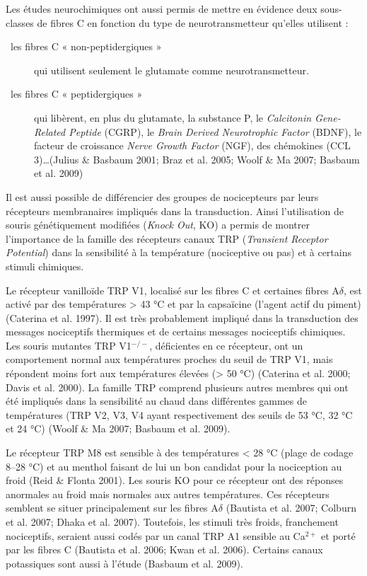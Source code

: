 \documentclass[a4paper,12pt,twoside]{report}
\begin{document}
Les études neurochimiques ont aussi permis de mettre en évidence deux sous-classes de fibres C en fonction du type de neurotransmetteur qu’elles utilisent :

\begin{description}
\item [\textbullet~les fibres C « non-peptidergiques »] qui utilisent seulement le glutamate comme neurotransmetteur. 
\item [\textbullet~les fibres C « peptidergiques »] qui libèrent, en plus du glutamate, la substance P, le \textit{Calcitonin Gene-Related Peptide} (CGRP), le \textit{Brain Derived Neurotrophic Factor} (BDNF), le facteur de croissance \textit{Nerve Growth Factor} (NGF), des chémokines (CCL 3)\ldots (Julius \& Basbaum 2001; Braz et al. 2005; Woolf \& Ma 2007; Basbaum et al. 2009)
\end{description}

Il est aussi possible de différencier des groupes de nocicepteurs par leurs récepteurs membranaires impliqués dans la transduction. Ainsi l’utilisation de souris génétiquement modifiées (\textit{Knock Out}, KO) a permis de montrer l’importance de la famille des récepteurs canaux TRP (\textit{Transient Receptor Potential}) dans la sensibilité à la température (nociceptive ou pas) et à certains stimuli chimiques. 

Le récepteur vanilloïde TRP V1, localisé sur les fibres C et certaines fibres A$\delta$, est activé par des températures > 43 °C et par la capsaïcine (l’agent actif du piment) (Caterina et al. 1997). Il est très probablement impliqué dans la transduction des messages nociceptifs thermiques et de certains messages nociceptifs chimiques. Les souris mutantes TRP V1$^{-/-}$, déficientes en ce récepteur, ont un comportement normal aux températures proches du seuil de TRP V1, mais répondent moins fort aux températures élevées (> 50 °C) (Caterina et al. 2000; Davis et al. 2000). La famille TRP comprend plusieurs autres membres qui ont été impliqués dans la sensibilité au chaud dans différentes gammes de températures (TRP V2, V3, V4 ayant respectivement des seuils de 53 °C, 32 °C et 24 °C) (Woolf \& Ma 2007; Basbaum et al. 2009).

Le récepteur TRP M8 est sensible à des températures < 28 °C (plage de codage 8–28 °C) et au menthol faisant de lui un bon candidat pour la nociception au froid (Reid \& Flonta 2001). Les souris KO pour ce récepteur ont des réponses anormales au froid mais normales aux autres températures. Ces récepteurs semblent se situer principalement sur les fibres A$\delta$ (Bautista et al. 2007; Colburn et al. 2007; Dhaka et al. 2007). Toutefois, les stimuli très froids, franchement nociceptifs, seraient aussi codés par un canal TRP A1 sensible au Ca$^{2+}$ et porté par les fibres C (Bautista et al. 2006; Kwan et al. 2006). Certains canaux potassiques sont aussi à l’étude (Basbaum et al. 2009).
\end{document}
